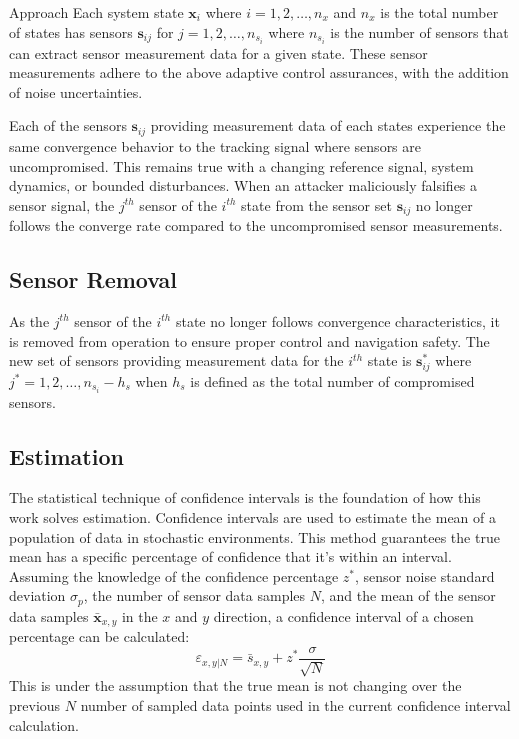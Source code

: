 \begin{section}{Approach}
Each system state $\bm{x}_i$ where $i=1,2,\dots,n_x$ and $n_x$ is the total number of states has sensors $\bm{s}_{ij}$ for $j=1,2,\dots,n_{s_i}$ where $n_{s_i}$ is the number of sensors that can extract sensor measurement data for a given state. These sensor measurements adhere to the above adaptive control assurances, with the addition of noise uncertainties.

Each of the sensors $\bm{s}_{ij}$ providing measurement data of each states experience the same convergence behavior to the tracking signal where sensors are uncompromised. This remains true with a changing reference signal, system dynamics, or bounded disturbances. When an attacker maliciously falsifies a sensor signal, the $j^{th}$ sensor of the $i^{th}$ state from the sensor set $\bm{s}_{ij}$ no longer follows the converge rate compared to the uncompromised sensor measurements. 

\subsection{Sensor Removal}

As the $j^{th}$ sensor of the $i^{th}$ state no longer follows convergence characteristics, it is removed from operation to ensure proper control and navigation safety. The new set of sensors providing measurement data for the $i^{th}$ state is $\bm{s}_{ij}^*$ where $j^*=1,2,\dots,n_{s_i}-h_s$ when $h_s$ is defined as the total number of compromised sensors.

\subsection{Estimation}

The statistical technique of confidence intervals is the foundation of how this work solves estimation. Confidence intervals are used to estimate the mean of a population of data in stochastic environments. This method guarantees the true mean has a specific percentage of confidence that it's within an interval. Assuming the knowledge of the confidence percentage $z^{*}$, sensor noise standard deviation $ \sigma_p $, the number of sensor data samples $N$, and the mean of the sensor data samples $ \bm{\bar{x}}_{x,y} $ in the $x$ and $y$ direction, a confidence interval of a chosen percentage can be calculated: 
 	\begin{equation}
		\varepsilon_{x,y|N} = \bar{s}_{x,y} + z^{*}\frac{\sigma}{\sqrt{N}}
	\end{equation}
This is under the assumption that the true mean is not changing over the previous $N$ number of sampled data points used in the current confidence interval calculation.


\end{section}
